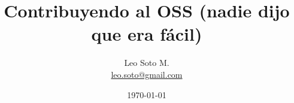 \title{Contribuyendo al OSS (nadie dijo que era fácil)}
\author{Leo Soto M.\\ \url{leo.soto@gmail.com}}
\date{\today}
